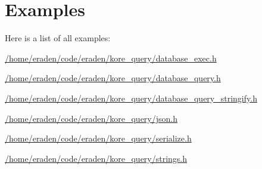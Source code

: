 \section{Examples}
Here is a list of all examples\+:\begin{DoxyCompactItemize}
\item 
\hyperlink{_2home_2eraden_2code_2eraden_2kore_query_2database_exec_8h-example}{/home/eraden/code/eraden/kore\+\_\+query/database\+\_\+exec.\+h}
\item 
\hyperlink{_2home_2eraden_2code_2eraden_2kore_query_2database_query_8h-example}{/home/eraden/code/eraden/kore\+\_\+query/database\+\_\+query.\+h}
\item 
\hyperlink{_2home_2eraden_2code_2eraden_2kore_query_2database_query_stringify_8h-example}{/home/eraden/code/eraden/kore\+\_\+query/database\+\_\+query\+\_\+stringify.\+h}
\item 
\hyperlink{_2home_2eraden_2code_2eraden_2kore_query_2json_8h-example}{/home/eraden/code/eraden/kore\+\_\+query/json.\+h}
\item 
\hyperlink{_2home_2eraden_2code_2eraden_2kore_query_2serialize_8h-example}{/home/eraden/code/eraden/kore\+\_\+query/serialize.\+h}
\item 
\hyperlink{_2home_2eraden_2code_2eraden_2kore_query_2strings_8h-example}{/home/eraden/code/eraden/kore\+\_\+query/strings.\+h}
\end{DoxyCompactItemize}
